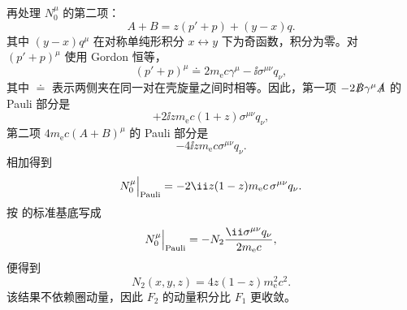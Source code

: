 \begin{derivation}
再处理 $N_0^\mu$ 的第二项：
\begin{equation*}
 A+B=z(p'+p)+(y-x)q.
\end{equation*}
其中 $(y-x)q^\mu$ 在对称单纯形积分 $x\leftrightarrow y$ 下为奇函数，积分为零。对 $(p'+p)^\mu$ 使用 Gordon 恒等，
\begin{equation*}
 (p'+p)^\mu
 \doteq 2m_{\mathrm e} c\gamma^\mu-\ii\sigma^{\mu\nu}q_\nu,
\end{equation*}
其中 $\doteq$ 表示两侧夹在同一对在壳旋量之间时相等。因此，第一项
$-2\slashed B\gamma^\mu\slashed A$ 的 Pauli 部分是
\begin{equation*}
 +2\ii zm_{\mathrm e} c(1+z)\sigma^{\mu\nu}q_\nu,
\end{equation*}
第二项 $4m_{\mathrm e} c(A+B)^\mu$ 的 Pauli 部分是
\begin{equation*}
 -4\ii zm_{\mathrm e} c\sigma^{\mu\nu}q_\nu.
\end{equation*}
相加得到
\begin{equation*}
 N_0^\mu\Big|_{\rm Pauli}
 =-2\ii z(1-z)m_{\mathrm e} c\,\sigma^{\mu\nu}q_\nu.
\end{equation*}
按  的标准基底写成
\begin{equation*}
 N_0^\mu\Big|_{\rm Pauli}
 =-N_2\frac{\ii\sigma^{\mu\nu}q_\nu}{2m_{\mathrm e} c},
\end{equation*}
便得到
\begin{equation*}
 {
 N_2(x,y,z)=4z(1-z)m_{\mathrm e}^2c^2.}
 \end{equation*}
该结果不依赖圈动量，因此 $F_2$ 的动量积分比 $F_1$ 更收敛。
\end{derivation}

